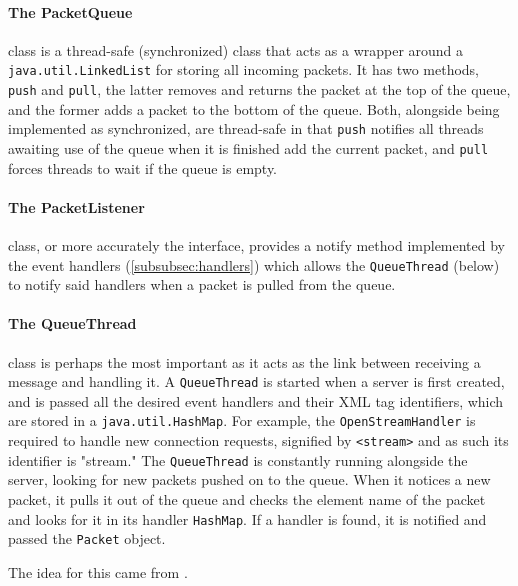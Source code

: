       \paragraph{The PacketQueue} class is a thread-safe (synchronized) class that acts as a wrapper around a \verb!java.util.LinkedList! for storing all incoming packets. It has two methods, \verb!push! and \verb!pull!, the latter removes and returns the packet at the top of the queue, and the former adds a packet to the bottom of the queue. Both, alongside being implemented as synchronized, are thread-safe in that \verb!push! notifies all threads awaiting use of the queue when it is finished add the current packet, and \verb!pull! forces threads to wait if the queue is empty.
      
      \paragraph{The PacketListener} class, or more accurately the interface, provides a notify method implemented by the event handlers (\textsection\ref{subsubsec:handlers}) which allows the \verb!QueueThread! (below) to notify said handlers when a packet is pulled from the queue.
      
      \paragraph{The QueueThread} class is perhaps the most important as it acts as the link between receiving a message and handling it. A \verb!QueueThread! is started when a server is first created, and is passed all the desired event handlers and their XML tag identifiers, which are stored in a \verb!java.util.HashMap!. For example, the \verb!OpenStreamHandler! is required to handle new connection requests, signified by \verb!<stream>! and as such its identifier is "stream." The \verb!QueueThread! is constantly running alongside the server, looking for new packets pushed on to the queue. When it notices a new packet, it pulls it out of the queue and checks the element name of the packet and looks for it in its handler \verb!HashMap!. If a handler is found, it is notified and passed the \verb!Packet! object.
      
      The idea for this came from \cite{Shigeoka:2002ys}.
      
